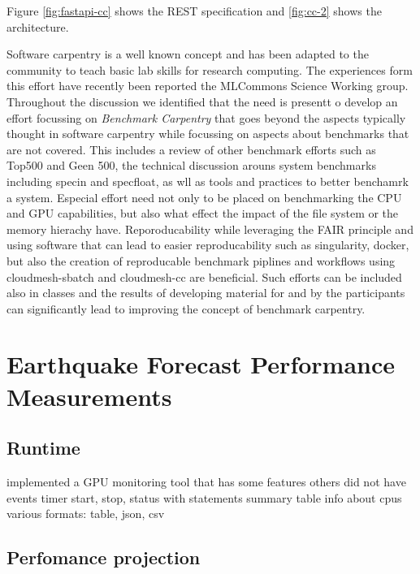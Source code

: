 \documentclass[utf8]{FrontiersinVancouver} %
\begin{document}
Figure \ref{fig:fastapi-cc} shows the REST specification and
\ref{fig:cc-2} shows the architecture.


Software carpentry \cite{software-carpentry} is a well known concept
and has been adapted to the community to teach basic lab skills for
research computing.  The experiences form this effort have recently
been reported the MLCommons Science Working group. Throughout the
discussion we identified that the need is presentt o develop an effort
focussing on {\em Benchmark Carpentry} that goes beyond the aspects
typically thought in software carpentry while focussing on aspects
about benchmarks that are not covered. This includes a review of other
benchmark efforts such as Top500 and Geen 500, the technical
discussion arouns system benchmarks including specin and specfloat, as
wll as tools and practices to better benchamrk a system. Especial
effort need not only to be placed on benchmarking the CPU and GPU
capabilities, but also what effect the impact of the file system or
the memory hierachy have. Reporoducability while leveraging the FAIR
principle and using software that can lead to easier reproducability
such as singularity, docker, but also the creation of reproducable
benchmark piplines and workflows using cloudmesh-sbatch and
cloudmesh-cc are beneficial. Such efforts can be included also in
classes and the results of developing material for and by the
participants can significantly lead to improving the concept of
benchmark carpentry.


\section{Earthquake Forecast Performance Measurements}
\label{sec:perf-main}



\subsection{Runtime}

\label{sec:perf-runtime}

implemented a GPU monitoring tool that has some features others did not have 
events
timer start, stop, status
with statements
summary table
info about cpus
various formats: table, json, csv



\subsection{Perfomance projection}
\end{document}

